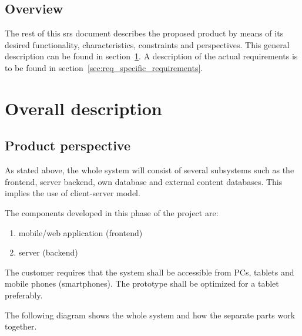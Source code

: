 \documentclass[11pt]{book}
\begin{document}
\subsection{Overview}
The rest of this \gls{srs} document describes the proposed product by means of its desired functionality, characteristics, constraints and perspectives. This general description can be found in section~\ref{sec:req_overall_description}. A description of the actual requirements is to be found in section~\ref{sec:req_specific_requirements}.

\section{Overall description}\label{sec:req_overall_description}
\subsection{Product perspective}
As stated above, the whole system will consist of several subsystems such as the frontend, server backend, own database and external content databases. This implies the use of client-server model.

The components developed in this phase of the project are:

\begin{enumerate}
  \item mobile/web application (frontend)
  \item server (backend)
\end{enumerate}

The customer requires that the system shall be accessible from PCs, tablets and mobile phones (smartphones). The prototype shall be optimized for a tablet preferably.

The following diagram shows the whole system and how the separate parts work together.
\end{document}
